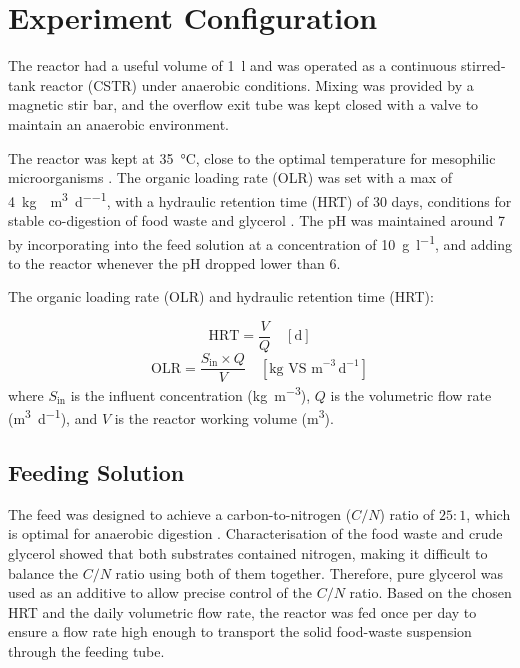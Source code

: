 \section{Experiment Configuration}
\label{sec:experiment_configuration}

The reactor had a useful volume of \qty{1}{\litre} and was operated as a continuous stirred-tank reactor (CSTR) under anaerobic conditions. Mixing was provided by a magnetic stir bar, and the overflow exit tube was kept closed with a valve to maintain an anaerobic environment.

The reactor was kept at \qty{35}{\celsius}, close to the optimal temperature for mesophilic microorganisms \parencite{choorit2007}. The organic loading rate (OLR) was set with a max of \qty{4}{\kilo\gram\VS\per\cubic\metre\per\day}, with a hydraulic retention time (HRT) of \num{30} days, conditions for stable co-digestion of food waste and glycerol \parencite{tomczak2025}. The pH was maintained around \num{7} by incorporating  into the feed solution at a concentration of \qty{10}{\gram\per\litre}, and adding  to the reactor whenever the pH dropped lower than \num{6}.

The organic loading rate (OLR) and hydraulic retention time (HRT):

\begin{equation}
    \text{HRT} = \frac{V}{Q} \quad [\text{d}]
    \label{eq:HRT}
\end{equation}
\begin{equation}
    \text{OLR} = \frac{S_{\text{in}} \times Q}{V} \quad [\text{kg VS m}^{-3}\,\text{d}^{-1}]
    \label{eq:OLR}
\end{equation}
where $S_{\text{in}}$ is the influent \unit{\VS} concentration (\unit{\kilo\gram\per\cubic\metre}), $Q$ is the volumetric flow rate (\unit{\cubic\metre\per\day}), and $V$ is the reactor working volume (\unit{\cubic\metre}).

\subsection{Feeding Solution}
\label{subsec:feeding_solution}

The feed was designed to achieve a carbon-to-nitrogen ($C/N$) ratio of $25:1$, which is optimal for anaerobic digestion \parencite{li2011}. Characterisation of the food waste and crude glycerol showed that both substrates contained nitrogen, making it difficult to balance the $C/N$ ratio using both of them together. Therefore, pure glycerol was used as an additive to allow precise control of the $C/N$ ratio. Based on the chosen HRT and the daily volumetric flow rate, the reactor was fed once per day to ensure a flow rate high enough to transport the solid food-waste suspension through the feeding tube.

